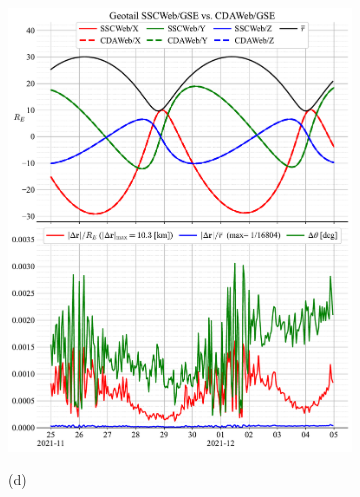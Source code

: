 \documentclass[draft]{agujournal2019}
\begin{document}
\begin{figure}[h]
\begin{subfigure}[b]{0.49\textwidth}
         \includegraphics[width=\textwidth]{code/figures/ephemeris/Geotail_SSCWeb-GSE_vs_CDAWeb-GSE.pdf}
     \end{subfigure}
     \begin{subfigure}[b]{0.49\textwidth}
         (d)
         \centering

\end{subfigure}
\end{figure}
\end{document}
